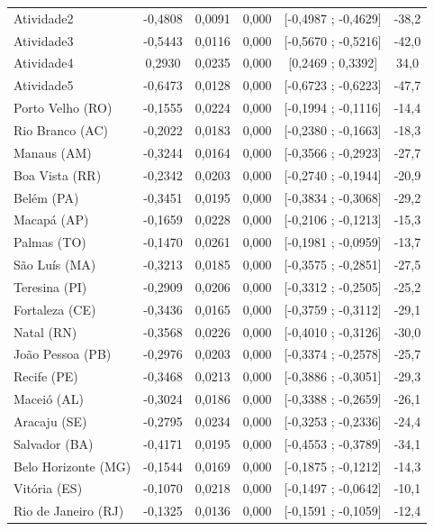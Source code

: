 \documentclass[12pt,a4paper,header]{abnt}
\begin{document}
\begin{center}
\begin{longtable}{lccccc}
Atividade2 & -0,4808 & 0,0091 & 0,000 & [-0,4987 ; -0,4629] & -38,2 \\
Atividade3 & -0,5443 & 0,0116 & 0,000 & [-0,5670 ; -0,5216] & -42,0 \\
Atividade4 & 0,2930 & 0,0235 & 0,000 & [0,2469 ; 0,3392] & 34,0 \\
Atividade5 & -0,6473 & 0,0128 & 0,000 & [-0,6723 ; -0,6223] & -47,7 \\
Porto Velho (RO) & -0,1555 & 0,0224 & 0,000 & [-0,1994 ; -0,1116] & -14,4 \\
Rio Branco (AC) & -0,2022 & 0,0183 & 0,000 & [-0,2380 ; -0,1663] & -18,3 \\
Manaus (AM) & -0,3244 & 0,0164 & 0,000 & [-0,3566 ; -0,2923] & -27,7 \\
Boa Vista (RR) & -0,2342 & 0,0203 & 0,000 & [-0,2740 ; -0,1944] & -20,9 \\
Belém (PA) & -0,3451 & 0,0195 & 0,000 & [-0,3834 ; -0,3068] & -29,2 \\
Macapá (AP) & -0,1659 & 0,0228 & 0,000 & [-0,2106 ; -0,1213] & -15,3 \\
Palmas (TO) & -0,1470 & 0,0261 & 0,000 & [-0,1981 ; -0,0959] & -13,7 \\
São Luís (MA) & -0,3213 & 0,0185 & 0,000 & [-0,3575 ; -0,2851] & -27,5 \\
Teresina (PI) & -0,2909 & 0,0206 & 0,000 & [-0,3312 ; -0,2505] & -25,2 \\
Fortaleza (CE) & -0,3436 & 0,0165 & 0,000 & [-0,3759 ; -0,3112] & -29,1 \\
Natal (RN) & -0,3568 & 0,0226 & 0,000 & [-0,4010 ; -0,3126] & -30,0 \\
João Pessoa (PB) & -0,2976 & 0,0203 & 0,000 & [-0,3374 ; -0,2578] & -25,7 \\
Recife (PE) & -0,3468 & 0,0213 & 0,000 & [-0,3886 ; -0,3051] & -29,3 \\
Maceió (AL) & -0,3024 & 0,0186 & 0,000 & [-0,3388 ; -0,2659] & -26,1 \\
Aracaju (SE) & -0,2795 & 0,0234 & 0,000 & [-0,3253 ; -0,2336] & -24,4 \\
Salvador (BA) & -0,4171 & 0,0195 & 0,000 & [-0,4553 ; -0,3789] & -34,1 \\
Belo Horizonte (MG) & -0,1544 & 0,0169 & 0,000 & [-0,1875 ; -0,1212] & -14,3 \\
Vitória (ES) & -0,1070 & 0,0218 & 0,000 & [-0,1497 ; -0,0642] & -10,1 \\
Rio de Janeiro (RJ) & -0,1325 & 0,0136 & 0,000 & [-0,1591 ; -0,1059] & -12,4 \\

\end{longtable}
\end{center}
\end{document}
